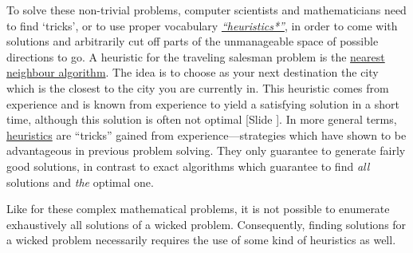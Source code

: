 \documentclass{article}
\newcounter{slide}
\begin{document}
To solve these non-trivial problems, computer scientists and mathematicians need to find `tricks', or to use proper vocabulary \emph{\href{https://en.wikipedia.org/wiki/Heuristic_(computer_science)}{``heuristics*''}}, in order to come with solutions and arbitrarily cut off parts of the unmanageable space of possible directions to go. A heuristic for the traveling salesman problem is the \href{https://en.wikipedia.org/wiki/Nearest_neighbour_algorithm}{nearest neighbour algorithm}. The idea is to choose as your next destination the city which is the closest to the city you are currently in. This heuristic comes from experience and is known from experience to yield a satisfying solution in a short time, although this solution is often not optimal {\color{blue}[Slide ]}. In more general terms, \href{https://en.wikipedia.org/wiki/Heuristic}{heuristics} are ``tricks'' gained from experience---strategies which have shown to be advantageous in previous problem solving. They only guarantee to generate fairly good solutions, in contrast to exact algorithms which guarantee to find \emph{all} solutions and \emph{the} optimal one. 

Like for these complex mathematical problems, it is not possible to enumerate exhaustively all solutions of a wicked problem. Consequently, finding solutions for a wicked problem necessarily requires the use of some kind of heuristics as well.
\end{document}
